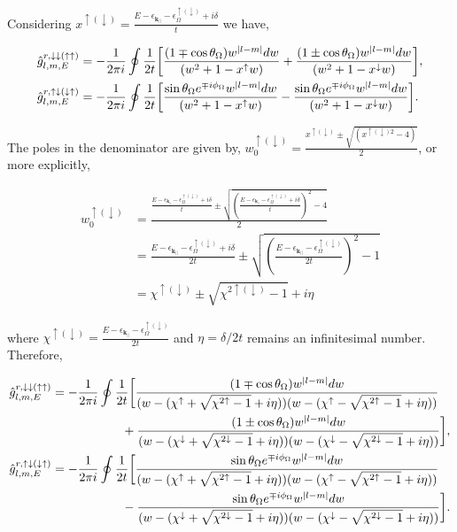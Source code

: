 \documentclass[10pt,prb,showpacs,amssymb,floatfix]{revtex4-1}
\newcommand{\dna}{\downarrow}
\newcommand{\nn}{\nonumber}
\newcommand{\upa}{\uparrow}
\newcommand{\dlt}{\delta}
\newcommand{\eps}{\epsilon}
\newcommand{\Og}{\Omega}
\begin{document}
Considering $x^{\upa(\dna)} = \frac{E-\eps_{\bm{k}_{||}}- \eps_\Og^{\upa(\dna)} + i\dlt}{t}$ we have,

\begin{align}
\hat{g}^{r, \dna\dna (\upa\upa)}_{l,m,E} &= -\frac{1}{2\pi i}\oint \frac{1}{2t} \bigg{[}   \frac{(1\mp\cos\theta_\Og) w^{|l-m|}dw}{(w^2 + 1 - x^\upa w )}+ \frac{(1\pm\cos\theta_\Og) w^{|l-m|}dw}{(  w^2 + 1 - x^{\dna} w  )} \bigg{]},  \\
\hat{g}^{r, \upa\dna(\dna\upa)}_{l, m, E}  &= -\frac{1}{2\pi i} \oint \frac{1}{2t} \bigg{[}\frac{ \sin\theta_\Og e^{\mp i\phi_\Og} w^{|l-m|}dw}{ (   w^2 + 1 - x^\upa w ) } - \frac{ \sin\theta_\Og e^{\mp i\phi_\Og} w^{|l-m|}dw}{(w^2 + 1 - x^\dna w   )}\bigg{]}.
\end{align}

The poles in the denominator are given by, $w_0^{\upa (\dna)} = \frac{x^{\upa (\dna)} \pm \sqrt{(x^{\upa (\dna) 2} - 4)}}{2}$, or more explicitly,


\begin{align}
w_0^{\upa (\dna)} &= \frac{\frac{E-\eps_{\bm{k}_{||}}- \eps_\Og^{\upa(\dna)} + i\dlt}{t} \pm \sqrt{ (\frac{E-\eps_{\bm{k}_{||}}- \eps_\Og^{\upa(\dna)} + i\dlt}{t})^2-4}}{2} \nn\\
&=\frac{E-\eps_{\bm{k}_{||}}- \eps_\Og^{\upa(\dna)} + i\dlt}{2t} \pm \sqrt{ (\frac{E-\eps_{\bm{k}_{||}}- \eps_\Og^{\upa(\dna)}}{2t})^2-1} \nn\\
&=\chi^{\upa (\dna)} \pm \sqrt{\chi^{2 \upa (\dna)} - 1 } + i\eta
\end{align}

where $\chi^{\upa (\dna)} = \frac{E-\eps_{\bm{k}_{||}}- \eps_\Og^{\upa(\dna)}}{2t}$ and $\eta =\dlt / 2t $ remains an infinitesimal number. Therefore,

\begin{align}
\hat{g}^{r, \dna\dna (\upa\upa)}_{l,m,E} &= -\frac{1}{2\pi i}\oint \frac{1}{2t} \bigg{[}   \frac{(1\mp\cos\theta_\Og) w^{|l-m|}dw}{(w -(\chi^{\upa } + \sqrt{\chi^{2 \upa } - 1 } + i\eta))(w - (\chi^{\upa } - \sqrt{\chi^{2 \upa } - 1 } + i\eta))} \nn\\ & ~~~~~~~~~~~~~~~~~+ \frac{(1\pm\cos\theta_\Og) w^{|l-m|}dw}{(w - (\chi^{\dna} + \sqrt{\chi^{2 \dna} - 1 } + i\eta))(w - (\chi^{\dna} - \sqrt{\chi^{2 \dna} - 1 } + i\eta))} \bigg{]},  \\
\hat{g}^{r, \upa\dna(\dna\upa)}_{l, m, E}  &= -\frac{1}{2\pi i} \oint \frac{1}{2t} \bigg{[}\frac{ \sin\theta_\Og e^{\mp i\phi_\Og} w^{|l-m|}dw}{ (w -(\chi^{\upa } + \sqrt{\chi^{2 \upa } - 1 } + i\eta))(w - (\chi^{\upa } - \sqrt{\chi^{2 \upa } - 1 } + i\eta )) } \nn\\& ~~~~~~~~~~~~~~~~~   - \frac{ \sin\theta_\Og e^{\mp i\phi_\Og} w^{|l-m|}dw}{(w - (\chi^{\dna} + \sqrt{\chi^{2 \dna} - 1 } + i\eta))(w - (\chi^{\dna} - \sqrt{\chi^{2 \dna} - 1 } + i\eta))}\bigg{]}.
\end{align}
\end{document}
